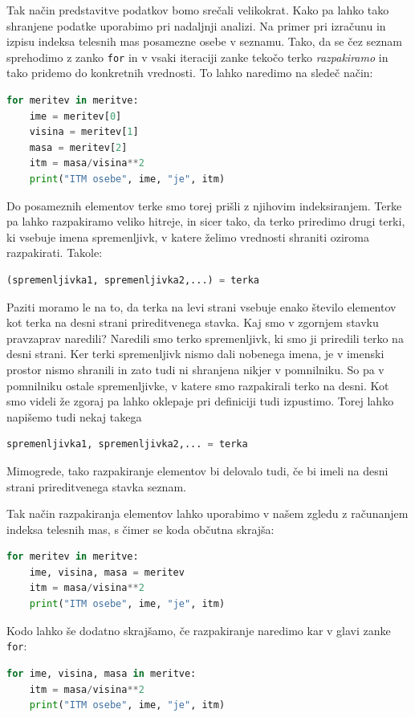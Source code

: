 Tak način predstavitve podatkov bomo srečali velikokrat. Kako pa lahko tako shranjene podatke uporabimo pri nadaljnji analizi. Na primer pri izračunu in izpisu indeksa telesnih mas posamezne osebe v seznamu. Tako, da se čez seznam sprehodimo z zanko \texttt{for} in v vsaki iteraciji zanke tekočo terko \emph{razpakiramo} in tako pridemo do konkretnih vrednosti. To lahko naredimo na sledeč način: 
\begin{lstlisting}[language=Python]
for meritev in meritve:
    ime = meritev[0]
    visina = meritev[1]
    masa = meritev[2]
    itm = masa/visina**2
    print("ITM osebe", ime, "je", itm)
\end{lstlisting}
Do posameznih elementov terke smo torej prišli z njihovim indeksiranjem. Terke pa lahko razpakiramo veliko hitreje, in sicer tako, da terko priredimo drugi terki, ki vsebuje imena spremenljivk, v katere želimo vrednosti shraniti oziroma razpakirati. Takole:
\begin{lstlisting}[language=Python]
(spremenljivka1, spremenljivka2,...) = terka
\end{lstlisting}
Paziti moramo le na to, da terka na levi strani vsebuje enako število elementov kot terka na desni strani prireditvenega stavka. Kaj smo v zgornjem stavku pravzaprav naredili? Naredili smo terko spremenljivk, ki smo ji priredili terko na desni strani. Ker terki spremenljivk nismo dali nobenega imena, je v imenski prostor nismo shranili in zato tudi ni shranjena nikjer v pomnilniku. So pa v pomnilniku ostale spremenljivke, v katere smo razpakirali terko na desni. Kot smo videli že zgoraj pa lahko oklepaje pri definiciji tudi izpustimo. Torej lahko napišemo tudi nekaj takega
\begin{lstlisting}[language=Python]
spremenljivka1, spremenljivka2,... = terka
\end{lstlisting}
Mimogrede, tako razpakiranje elementov bi delovalo tudi, če bi imeli na desni strani prireditvenega stavka seznam.

Tak način razpakiranja elementov lahko uporabimo v našem zgledu z računanjem indeksa telesnih mas, s čimer se koda občutna skrajša:
\begin{lstlisting}[language=Python]
for meritev in meritve:
    ime, visina, masa = meritev
    itm = masa/visina**2
    print("ITM osebe", ime, "je", itm)
\end{lstlisting}
Kodo lahko še dodatno skrajšamo, če razpakiranje naredimo kar v glavi zanke \texttt{for}:
\begin{lstlisting}[language=Python]
for ime, visina, masa in meritve:
    itm = masa/visina**2
    print("ITM osebe", ime, "je", itm)
\end{lstlisting}

